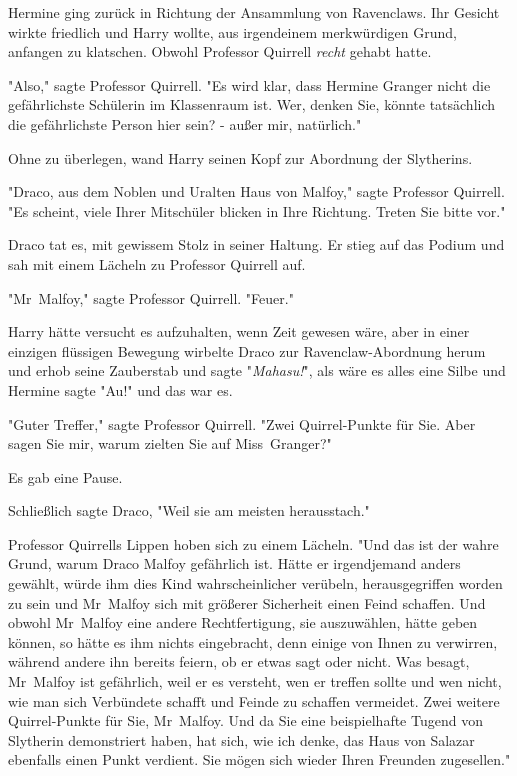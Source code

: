 {Hermine ging zurück in Richtung der Ansammlung von Ravenclaws. Ihr Gesicht wirkte friedlich und Harry wollte, aus irgendeinem merkwürdigen Grund, anfangen zu klatschen. Obwohl Professor Quirrell \emph{recht} gehabt hatte.

"Also," sagte Professor Quirrell. "Es wird klar, dass Hermine Granger nicht die gefährlichste Schülerin im Klassenraum ist. Wer, denken Sie, könnte tatsächlich die gefährlichste Person hier sein? - außer mir, natürlich."

Ohne zu überlegen, wand Harry seinen Kopf zur Abordnung der Slytherins.

"Draco, aus dem Noblen und Uralten Haus von Malfoy," sagte Professor Quirrell. "Es scheint, viele Ihrer Mitschüler blicken in Ihre Richtung. Treten Sie bitte vor."

Draco tat es, mit gewissem Stolz in seiner Haltung. Er stieg auf das Podium und sah mit einem Lächeln zu Professor Quirrell auf.

"Mr~Malfoy," sagte Professor Quirrell. "Feuer."

Harry hätte versucht es aufzuhalten, wenn Zeit gewesen wäre, aber in einer einzigen flüssigen Bewegung wirbelte Draco zur Ravenclaw-Abordnung herum und erhob seine Zauberstab und sagte "\emph{Mahasu!}", als wäre es alles eine Silbe und Hermine sagte "Au!" und das war es.

"Guter Treffer," sagte Professor Quirrell. "Zwei Quirrel-Punkte für Sie. Aber sagen Sie mir, warum zielten Sie auf Miss~Granger?"

Es gab eine Pause.

Schließlich sagte Draco, "Weil sie am meisten herausstach."

Professor Quirrells Lippen hoben sich zu einem Lächeln. "Und das ist der wahre Grund, warum Draco Malfoy gefährlich ist. Hätte er irgendjemand anders gewählt, würde ihm dies Kind wahrscheinlicher verübeln, herausgegriffen worden zu sein und Mr~Malfoy sich mit größerer Sicherheit einen Feind schaffen. Und obwohl Mr~Malfoy eine andere Rechtfertigung, sie auszuwählen, hätte geben können, so hätte es ihm nichts eingebracht, denn einige von Ihnen zu verwirren, während andere ihn bereits feiern, ob er etwas sagt oder nicht. Was besagt, Mr~Malfoy ist gefährlich, weil er es versteht, wen er treffen sollte und wen nicht, wie man sich Verbündete schafft und Feinde zu schaffen vermeidet. Zwei weitere Quirrel-Punkte für Sie, Mr~Malfoy. Und da Sie eine beispielhafte Tugend von Slytherin demonstriert haben, hat sich, wie ich denke, das Haus von Salazar ebenfalls einen Punkt verdient. Sie mögen sich wieder Ihren Freunden zugesellen."

}
